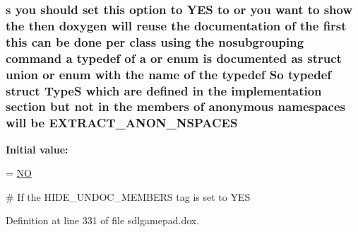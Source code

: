 \hypertarget{sdlgamepad_8dox_a7e1f20bfa451cb50f83a07ffe19863e7}{
\subsubsection[{E\-X\-T\-R\-A\-C\-T\-\_\-\-A\-N\-O\-N\-\_\-\-N\-S\-P\-A\-C\-E\-S}]{ {\bf s} you should {\bf set} this option to Y\-E\-S to or you want to show the then doxygen will reuse the documentation of the {\bf first} this can be {\bf done} per class using the nosubgrouping command {\bf a} typedef of {\bf a} or enum is documented as {\bf struct} {\bf union} or enum with the {\bf name} of the typedef So typedef {\bf struct} {\bf Type\-S} which {\bf are} defined {\bf in} the implementation section but {\bf not} {\bf in} the members of anonymous namespaces will be E\-X\-T\-R\-A\-C\-T\-\_\-\-A\-N\-O\-N\-\_\-\-N\-S\-P\-A\-C\-E\-S}}\label{sdlgamepad_8dox_a7e1f20bfa451cb50f83a07ffe19863e7}
{\bfseries Initial value\-:}
\begin{DoxyCode}
= \hyperlink{sdlgamepad_8dox_a0f6a46245280dc38baf9600906aa1393}{NO}

\textcolor{preprocessor}{# If the HIDE\_UNDOC\_MEMBERS tag is set to YES}
\end{DoxyCode}


Definition at line 331 of file sdlgamepad.\-dox.

